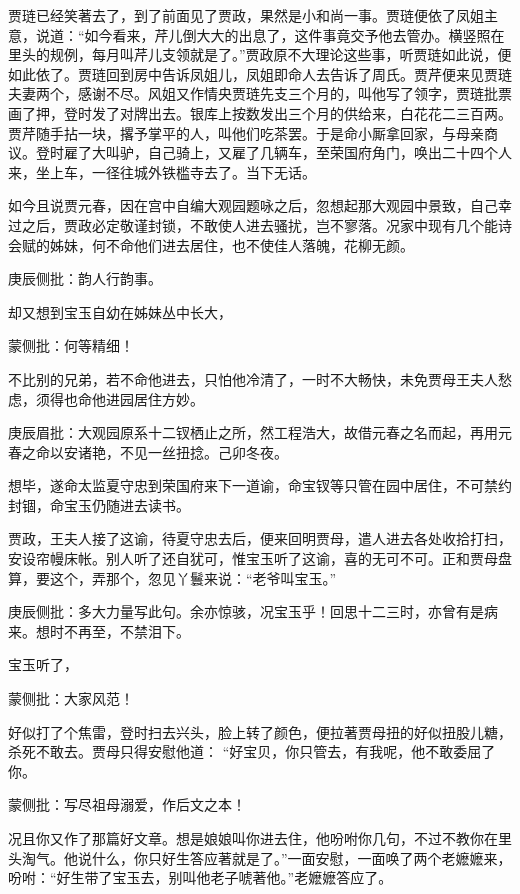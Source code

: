 \begin{parag}
    贾琏已经笑著去了，到了前面见了贾政，果然是小和尚一事。贾琏便依了凤姐主意，说道：“如今看来，芹儿倒大大的出息了，这件事竟交予他去管办。横竖照在里头的规例，每月叫芹儿支领就是了。”贾政原不大理论这些事，听贾琏如此说，便如此依了。贾琏回到房中告诉凤姐儿，凤姐即命人去告诉了周氏。贾芹便来见贾琏夫妻两个，感谢不尽。风姐又作情央贾琏先支三个月的，叫他写了领字，贾琏批票画了押，登时发了对牌出去。银库上按数发出三个月的供给来，白花花二三百两。贾芹随手拈一块，撂予掌平的人，叫他们吃茶罢。于是命小厮拿回家，与母亲商议。登时雇了大叫驴，自己骑上，又雇了几辆车，至荣国府角门，唤出二十四个人来，坐上车，一径往城外铁槛寺去了。当下无话。
\end{parag}


\begin{parag}
    如今且说贾元春，因在宫中自编大观园题咏之后，忽想起那大观园中景致，自己幸过之后，贾政必定敬谨封锁，不敢使人进去骚扰，岂不寥落。况家中现有几个能诗会赋的姊妹，何不命他们进去居住，也不使佳人落魄，花柳无颜。\begin{note}庚辰侧批：韵人行韵事。\end{note}却又想到宝玉自幼在姊妹丛中长大，\begin{note}蒙侧批：何等精细！\end{note}不比别的兄弟，若不命他进去，只怕他冷清了，一时不大畅快，未免贾母王夫人愁虑，须得也命他进园居住方妙。\begin{note}庚辰眉批：大观园原系十二钗栖止之所，然工程浩大，故借元春之名而起，再用元春之命以安诸艳，不见一丝扭捻。己卯冬夜。\end{note}想毕，遂命太监夏守忠到荣国府来下一道谕，命宝钗等只管在园中居住，不可禁约封锢，命宝玉仍随进去读书。
\end{parag}


\begin{parag}
    贾政，王夫人接了这谕，待夏守忠去后，便来回明贾母，遣人进去各处收拾打扫，安设帘幔床帐。别人听了还自犹可，惟宝玉听了这谕，喜的无可不可。正和贾母盘算，要这个，弄那个，忽见丫鬟来说：“老爷叫宝玉。”\begin{note}庚辰侧批：多大力量写此句。余亦惊骇，况宝玉乎！回思十二三时，亦曾有是病来。想时不再至，不禁泪下。\end{note}宝玉听了，\begin{note}蒙侧批：大家风范！\end{note}好似打了个焦雷，登时扫去兴头，脸上转了颜色，便拉著贾母扭的好似扭股儿糖，杀死不敢去。贾母只得安慰他道： “好宝贝，你只管去，有我呢，他不敢委屈了你。\begin{note}蒙侧批：写尽祖母溺爱，作后文之本！\end{note}况且你又作了那篇好文章。想是娘娘叫你进去住，他吩咐你几句，不过不教你在里头淘气。他说什么，你只好生答应著就是了。”一面安慰，一面唤了两个老嬷嬷来，吩咐：“好生带了宝玉去，别叫他老子唬著他。”老嬷嬷答应了。
\end{parag}


